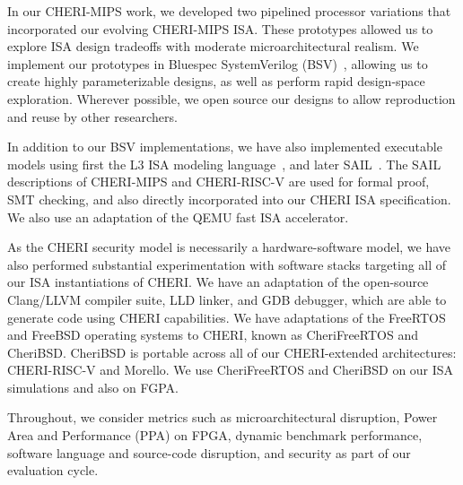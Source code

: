 In our CHERI-MIPS work, we developed two pipelined processor variations that
incorporated our evolving CHERI-MIPS ISA.
These prototypes allowed us to explore ISA design tradeoffs with moderate
microarchitectural realism.
We implement our prototypes in Bluespec SystemVerilog
(BSV)~\cite{Bluespec:TFRG}, allowing us to create highly parameterizable
designs, as well as perform rapid design-space exploration.
Wherever possible, we open source our designs to allow reproduction and reuse
by other researchers.

In addition to our BSV implementations, we have also implemented executable
models using first the L3 ISA modeling language~\cite{Fox2015}, and later
SAIL~\cite{sail-popl2019}.
The SAIL descriptions of CHERI-MIPS and CHERI-RISC-V are used for formal
proof, SMT checking, and also directly incorporated into our CHERI ISA
specification.
We also use an adaptation of the QEMU fast ISA accelerator.

As the CHERI security model is necessarily a hardware-software model, we have
also performed substantial experimentation with software stacks targeting all
of our ISA instantiations of CHERI.
We have an adaptation of the open-source Clang/LLVM compiler suite, LLD
linker, and GDB debugger, which are able to generate code using CHERI
capabilities.
We have adaptations of the FreeRTOS and FreeBSD operating systems to CHERI,
known as CheriFreeRTOS and CheriBSD.
CheriBSD is portable across all of our CHERI-extended architectures:
CHERI-RISC-V and Morello.
We use CheriFreeRTOS and CheriBSD on our ISA simulations and also on FGPA.

Throughout, we consider metrics such as microarchitectural disruption, Power
Area and Performance (PPA) on FPGA, dynamic benchmark performance, software
language and source-code disruption, and security as part of our evaluation
cycle.
